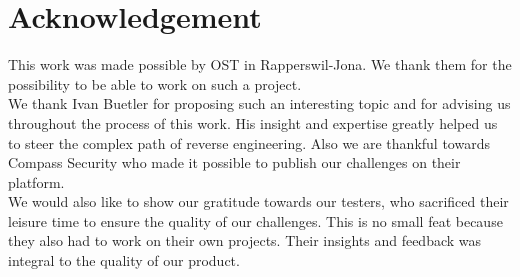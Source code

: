 \chapter{Acknowledgement}

This work was made possible by OST in Rapperswil-Jona. We thank them for the possibility to be able to work on such a project. \\

We thank Ivan Buetler for proposing such an interesting topic and for advising us throughout the process of this work. His insight and expertise greatly helped us to steer the complex path of reverse engineering. Also we are thankful towards Compass Security who made it possible to publish our challenges on their platform.  \\

We would also like to show our gratitude towards our testers, who sacrificed their leisure time to ensure the quality of our challenges. This is no small feat because they also had to work on their own projects. Their insights and feedback was integral to the quality of our product.
